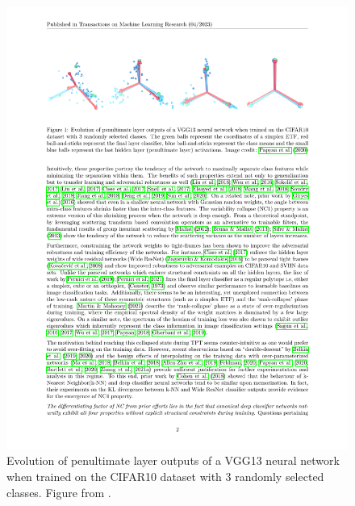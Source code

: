 \documentclass[../../book-main.tex]{subfiles}
\begin{document}
\begin{figure}
	\centering
	\includegraphics[width=0.95\linewidth]{chapters/chapter3/figs/neural_collapse.pdf}
	\caption{Evolution of penultimate layer outputs of a VGG13 neural network when trained on the CIFAR10 dataset with 3 randomly selected classes. Figure from \cite{papyan2020prevalence}.}
	\label{chap4-fig:neural-collapse}
\end{figure}
\end{document}
